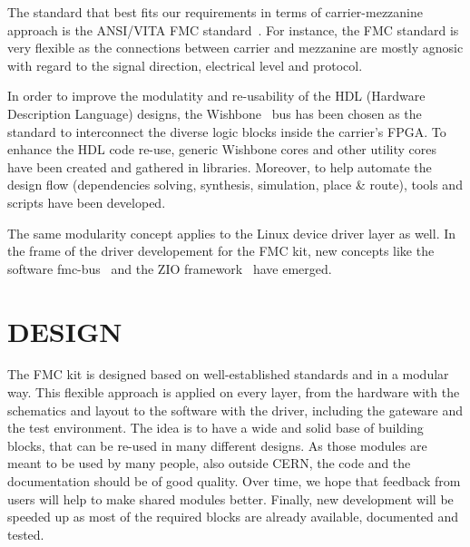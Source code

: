 \documentclass{JAC2003}
\begin{document}
The standard that best fits our requirements in terms of carrier-mezzanine approach is the ANSI/VITA FMC standard~\cite{fmc}.
For instance, the FMC standard is very flexible as the connections between carrier and mezzanine are mostly agnosic with regard to the signal direction, electrical level and protocol.


In order to improve the modulatity and re-usability of the HDL (Hardware Description Language) designs, the Wishbone~\cite{wishbone} bus has been chosen as the standard to interconnect the diverse logic blocks inside the carrier's FPGA.
To enhance the HDL code re-use, generic Wishbone cores and other utility cores have been created and gathered in libraries.
Moreover, to help automate the design flow (dependencies solving, synthesis, simulation, place \& route), tools and scripts have been developed.

The same modularity concept applies to the Linux device driver layer as well.
In the frame of the driver developement for the FMC kit, new concepts like the software fmc-bus~\cite{fmc-bus} and the ZIO framework~\cite{zio} have emerged.


\section{DESIGN}

The FMC kit is designed based on well-established standards and in a modular way.
This flexible approach is applied on every layer, from the hardware with the schematics and layout to the software with the driver, including the gateware and the test environment.
The idea is to have a wide and solid base of building blocks, that can be re-used in many different designs.
As those modules are meant to be used by many people, also outside CERN, the code and the documentation should be of good quality.
Over time, we hope that feedback from users will help to make shared modules better.
Finally, new development will be speeded up as most of the required blocks are already available, documented and tested.
\end{document}
